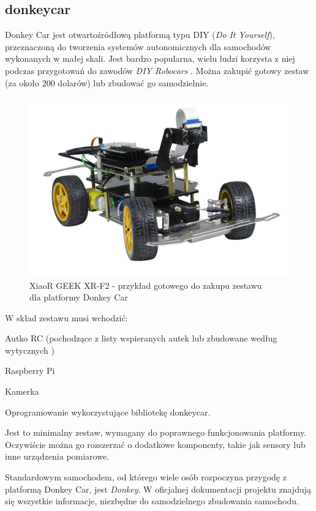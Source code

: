 \subsection{donkeycar}
Donkey Car jest otwartoźródłową platformą typu DIY (\textit{Do It Yourself}), przeznaczoną do tworzenia systemów autonomicznych dla samochodów wykonanych w małej skali. Jest bardzo popularna, wielu ludzi korzysta z niej podczas przygotowań do zawodów \textit{DIY Robocars} \cite{diyrobocars:website}. Można zakupić gotowy zestaw (za około 200 dolarów) lub zbudować go samodzielnie.
\begin{figure}[H]
\centering
\includegraphics[width=15cm]{resources/figures/donkeycar_example.png}
\caption{XiaoR GEEK XR-F2 - przykład gotowego do zakupu zestawu \\dla platformy Donkey Car}
\label{DonkeycarExample}
\end{figure}
W skład zestawu musi wchodzić:
\begin{enumerate*}
\item Autko RC (pochodzące z listy wspieranych autek \cite{donkeyCar:supportedCars} lub zbudowane według wytycznych \cite{donkeyCar:rollYourOwn})
\item Raspberry Pi \cite{raspberrypi:overview}
\item Kamerka
\item Oprogramowanie wykorzystujące bibliotekę donkeycar.
\end{enumerate*}
Jest to minimalny zestaw, wymagany do poprawnego funkcjonowania platformy. Oczywiście można go rozszerzać o dodatkowe komponenty, takie jak sensory lub inne urządzenia pomiarowe.

Standardowym samochodem, od którego wiele osób rozpoczyna przygodę z platformą Donkey Car, jest \textit{Donkey}.
W oficjalnej dokumentacji projektu \cite{donkeycar:docs} znajdują się wszystkie informacje, niezbędne do samodzielnego zbudowania samochodu.

